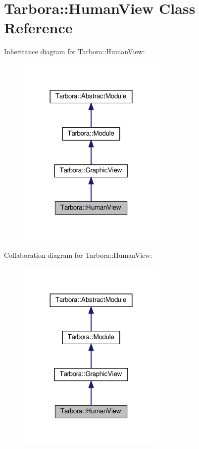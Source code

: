 \hypertarget{classTarbora_1_1HumanView}{}\section{Tarbora\+:\+:Human\+View Class Reference}
\label{classTarbora_1_1HumanView}


Inheritance diagram for Tarbora\+:\+:Human\+View\+:\nopagebreak
\begin{figure}[H]
\begin{center}
\leavevmode
\includegraphics[width=204pt]{classTarbora_1_1HumanView__inherit__graph}
\end{center}
\end{figure}


Collaboration diagram for Tarbora\+:\+:Human\+View\+:\nopagebreak
\begin{figure}[H]
\begin{center}
\leavevmode
\includegraphics[width=204pt]{classTarbora_1_1HumanView__coll__graph}
\end{center}
\end{figure}
